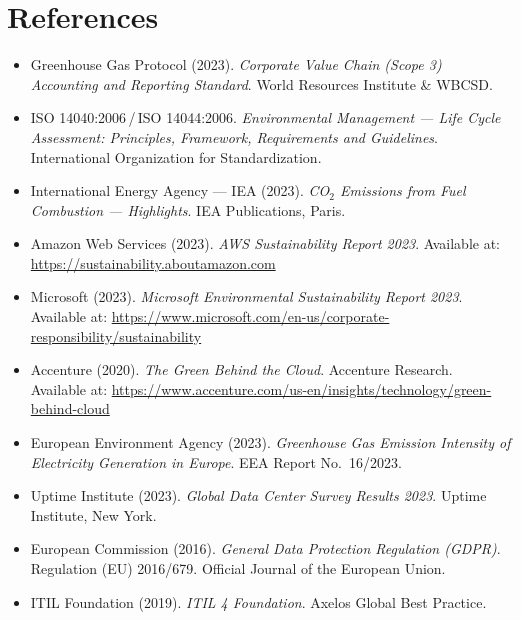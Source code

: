 \chapter*{References}

\begin{itemize}[label={}, leftmargin=1.5em, itemsep=0.3em]
  \item Greenhouse Gas Protocol (2023). \textit{Corporate Value Chain
    (Scope 3) Accounting and Reporting Standard}. World Resources
    Institute \& WBCSD.
  \item ISO 14040:2006\,/\,ISO 14044:2006. \textit{Environmental
    Management --- Life Cycle Assessment: Principles, Framework,
    Requirements and Guidelines}. International Organization for
    Standardization.
  \item International Energy Agency --- IEA (2023). \textit{CO$_2$
    Emissions from Fuel Combustion --- Highlights}. IEA Publications,
    Paris.
  \item Amazon Web Services (2023). \textit{AWS Sustainability Report
    2023}. Available at: \url{https://sustainability.aboutamazon.com}
  \item Microsoft (2023). \textit{Microsoft Environmental Sustainability
    Report 2023}. Available at:
    \url{https://www.microsoft.com/en-us/corporate-responsibility/sustainability}
  \item Accenture (2020). \textit{The Green Behind the Cloud}. Accenture
    Research. Available at:
    \url{https://www.accenture.com/us-en/insights/technology/green-behind-cloud}
  \item European Environment Agency (2023). \textit{Greenhouse Gas
    Emission Intensity of Electricity Generation in Europe}. EEA Report
    No.~16/2023.
  \item Uptime Institute (2023). \textit{Global Data Center Survey Results
    2023}. Uptime Institute, New York.
  \item European Commission (2016). \textit{General Data Protection
    Regulation (GDPR)}. Regulation (EU) 2016/679. Official Journal of
    the European Union.
  \item ITIL Foundation (2019). \textit{ITIL 4 Foundation}. Axelos
    Global Best Practice.
\end{itemize}

